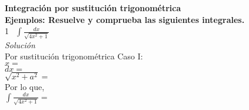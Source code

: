 \documentclass[12pt,a4paper]{article}
\begin{document}
{\bf Integración por sustitución trigonométrica}\\

{\bf Ejemplos: Resuelve y comprueba las siguientes integrales.}\\

\textcircled{1}\ $\displaystyle{\int\frac{dx}{\sqrt{4x^2+1}}}$\\

{\it Solución}\\

Por sustitución trigonométrica Caso I:\\
$x=$\\
$dx=$\\
$\sqrt{x^2+a^2}=$\\

Por lo que,\\
$\displaystyle{\int\frac{dx}{\sqrt{4x^2+1}}}=$\\
\end{document}
